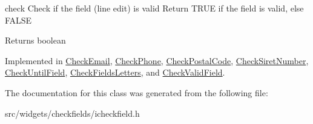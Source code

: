 check Check if the field (line edit) is valid Return T\+R\+U\+E if the field is valid, else F\+A\+L\+S\+E 

\begin{DoxyReturn}{Returns}
boolean 
\end{DoxyReturn}


Implemented in \hyperlink{classCheckEmail_a544d7656d36bd463391fe2f4dd3e13c6}{Check\+Email}, \hyperlink{classCheckPhone_ac60f1428fc89e1b2630db022e14509ed}{Check\+Phone}, \hyperlink{classCheckPostalCode_ad91ba5622617675fbb5c767036163142}{Check\+Postal\+Code}, \hyperlink{classCheckSiretNumber_aaf0a1411e380789062564bd992e72c1b}{Check\+Siret\+Number}, \hyperlink{classCheckUntilField_acfb9e2f95bebcb5b5d2337e3ac4f4d47}{Check\+Until\+Field}, \hyperlink{classCheckFieldsLetters_a62574deb407fe83456e46381425a7b46}{Check\+Fields\+Letters}, and \hyperlink{classCheckValidField_a192b1c9c84ea8897661425fd3c0b9e8e}{Check\+Valid\+Field}.



The documentation for this class was generated from the following file\+:\begin{DoxyCompactItemize}
\item 
src/widgets/checkfields/icheckfield.\+h\end{DoxyCompactItemize}
